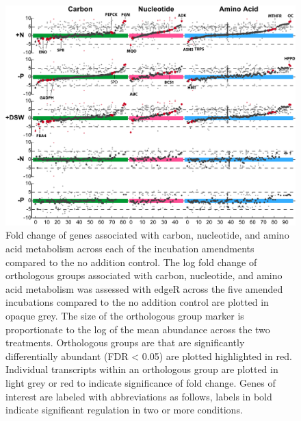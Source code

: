 \begin{figure}[p!]

  \centering
  \includegraphics[width=1\textwidth]{Images/C6_FigureS6_MckewCarbon.png}
    \caption[Fold change of genes associated with carbon, nucleotide, and amino acid metabolism across each of the incubation amendments]{Fold change of genes associated with carbon, nucleotide, and amino acid metabolism across each of the incubation amendments compared to the no addition control. The log fold change of orthologous groups associated with carbon, nucleotide, and amino acid metabolism was assessed with edgeR across the five amended incubations compared to the no addition control are plotted in opaque grey. The size of the orthologous group marker is proportionate to the log of the mean abundance across the two treatments. Orthologous groups are that are significantly differentially abundant (FDR < 0.05) are plotted highlighted in red. Individual transcripts within an orthologous group are plotted in light grey or red to indicate significance of fold change. Genes of interest are labeled with abbreviations as follows, labels in bold indicate significant regulation in two or more conditions. }
    \label{fig:a5f6}
\end{figure}


